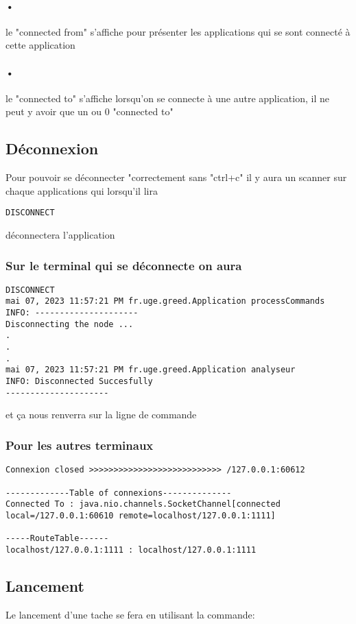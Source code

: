 \documentclass[a4paper,titlepage]{report}
\begin{document}
\paragraph{•}
le "connected from" s'affiche pour présenter les applications qui se sont connecté à cette application
\paragraph{•}
le "connected to" s'affiche lorsqu'on se connecte à une autre application, il ne peut y avoir que un ou 0 "connected to"
\subsection{Déconnexion}
Pour pouvoir se déconnecter "correctement sans "ctrl+c" il y aura un scanner sur chaque applications qui lorsqu'il lira 
\begin{lstlisting}
DISCONNECT 
\end{lstlisting}
déconnectera l'application 
\subsubsection{Sur le terminal qui se déconnecte on aura}
\begin{lstlisting}
DISCONNECT
mai 07, 2023 11:57:21 PM fr.uge.greed.Application processCommands
INFO: ---------------------
Disconnecting the node ...
.
.
.
mai 07, 2023 11:57:21 PM fr.uge.greed.Application analyseur
INFO: Disconnected Succesfully
---------------------
\end{lstlisting}
et ça nous renverra sur la ligne de commande
\subsubsection{Pour les autres terminaux}
\begin{lstlisting}
Connexion closed >>>>>>>>>>>>>>>>>>>>>>>>>>> /127.0.0.1:60612

-------------Table of connexions--------------
Connected To : java.nio.channels.SocketChannel[connected local=/127.0.0.1:60610 remote=localhost/127.0.0.1:1111]

-----RouteTable------
localhost/127.0.0.1:1111 : localhost/127.0.0.1:1111
\end{lstlisting}
\subsection{Lancement}
Le lancement d'une tache se fera en utilisant la commande:
\end{document}
